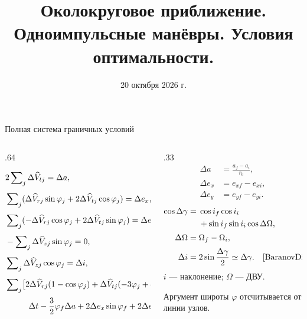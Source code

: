 \documentclass[11pt,aspectratio=169,t]{beamer}
\title{Околокруговое приближение.\\Одноимпульсные манёвры. Условия оптимальности.}
\date{20 октября 2026 г.}
\newcommand{\eqcompact}{\fontsize{10}{12}\selectfont}
\begin{document}
\newcommand{\derivationmathspacing}{%
  \setlength{\abovedisplayskip}{2pt}%
  \setlength{\belowdisplayskip}{3pt}%
  \setlength{\abovedisplayshortskip}{2pt}%
  \setlength{\belowdisplayshortskip}{2pt}%
  \setlength{\jot}{2pt}}

\begin{frame}[plain]
\titlepage
\end{frame}

\begin{frame}{Полная система граничных условий}
\relax
\derivationmathspacing
\begin{columns}[T,onlytextwidth]
\begin{column}{.64\textwidth}
{\eqcompact\derivationmathspacing
\centering\(\displaystyle
\begin{aligned}[t]
 &2\sum\nolimits_j\Delta\widehat V_{tj}=\Delta a,\\[4pt]
 &\sum\nolimits_j(\Delta\widehat V_{rj}\sin\varphi_j+
              2\Delta\widehat V_{tj}\cos\varphi_j)=\Delta e_x,\\[4pt]
 &\sum\nolimits_j(-\Delta\widehat V_{rj}\cos\varphi_j+
              2\Delta\widehat V_{tj}\sin\varphi_j)=\Delta e_y,\\[4pt]
 &-\sum\nolimits_j\Delta\widehat V_{zj}\sin\varphi_j=0,\\[4pt]
 &\sum\nolimits_j\Delta\widehat V_{zj}\cos\varphi_j=\Delta i,\\[4pt]
 &\sum\nolimits_j\bigl[2\Delta\widehat V_{rj}(1-\cos\varphi_j)
       +\Delta\widehat V_{tj}(-3\varphi_j+4\sin\varphi_j)\bigr]
       =\\[2pt]
 &\hspace{10mm}\Delta t-\frac32\varphi_f\Delta a
       +2\Delta e_x\sin\varphi_f+2\Delta e_y(1-\cos\varphi_f).
\end{aligned}
\)\par}
\end{column}
\begin{column}{.33\textwidth}
{\eqcompact\derivationmathspacing
\[
\begin{aligned}
 \Delta a&=\frac{a_f-a_i}{r_0},\\[2pt]
 \Delta e_x&=e_{xf}-e_{xi},\\[2pt]
 \Delta e_y&=e_{yf}-e_{yi}.
\end{aligned}
\]
}
\RaggedRight
{\eqcompact\derivationmathspacing
\[
\begin{aligned}
 \cos\Delta\gamma={}&\cos i_f\cos i_i\\
   &+\sin i_f\sin i_i\cos\Delta\Omega,\\[2pt]
 \Delta\Omega={}&\Omega_f-\Omega_i,\\[2pt]
 \Delta i={}&2\sin\frac{\Delta\gamma}{2}\simeq\Delta\gamma.\quad\text{\cite{BaranovDissertation}}
\end{aligned}
\]
}
$i$ --- наклонение; $\Omega$ --- ДВУ.
\par\smallskip
Аргумент широты $\varphi$ отсчитывается от линии узлов.
\end{column}
\end{columns}
\end{frame}
\end{document}
